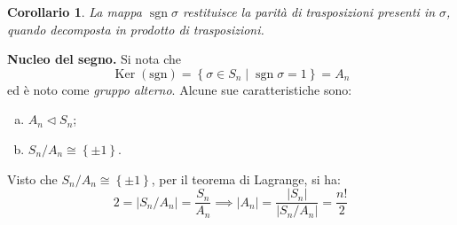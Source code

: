 \documentclass[11pt]{scrartcl}
\theoremstyle{style1}
\newtheorem{corollario}{Corollario}[teorema]
\numberwithin{equation}{subsection}
\renewcommand{\textbf}[1]{\textsf{\bfseries #1}}
\begin{document}
\begin{corollario}
	La mappa $\operatorname{sgn} \sigma $ restituisce la parit\`a di trasposizioni presenti in $\sigma $, quando decomposta in prodotto di trasposizioni.
\end{corollario}

\textbf{Nucleo del segno.} 
Si nota che 
\begin{equation}
	\operatorname{Ker} (\mathrm{sgn}) = \left\{ \sigma \in S_n  \mid \operatorname{sgn} \sigma  = 1\right\} = A_n
\end{equation}
ed \`e noto come \textit{gruppo alterno}. 
Alcune sue caratteristiche sono:
\begin{enumerate}[(a).]
	\item $A_n \lhd S_n$;
	\item $S_n / A_n \cong \left\{ \pm 1 \right\} $.
\end{enumerate}
Visto che $S_n / A_n\cong \left\{ \pm 1 \right\} $, per il teorema di Lagrange, si ha:
\[
2 = \lvert S_n / A_n \rvert = \frac{S_n}{A_n} \implies \lvert A_n \rvert = \frac{\lvert S_n \rvert }{\lvert S_n / A_n \rvert } = \frac{n!}{2}
\] 

\vspace{5pt}
\end{document}
